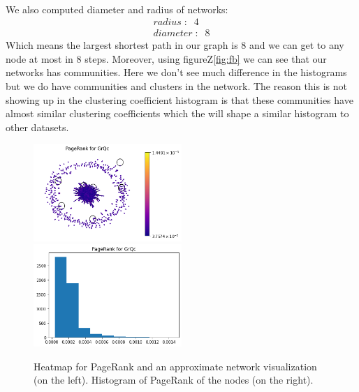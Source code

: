 \documentclass[letterpaper, 11pt]{article}
\newcommand{\1}{\mathds{1}}	%
\theoremstyle{definition}
\begin{document}
\paragraph{}We also computed diameter and radius of networks:
\begin{equation}
\begin{split} 
radius\; :\;\; 4 \\
diameter\;:\;\; 8
\end{split}
\end{equation}
Which means the largest shortest path in our graph is 8 and we can get to any node at most in 8 steps. Moreover, using figureZ\ref{fig:fb} we can see that our networks has communities. Here we don't see much difference in the histograms but we do have communities and clusters in the network. The reason this is not showing up in the clustering coefficient histogram is that these communities have almost similar clustering coefficients which the will shape a similar histogram to other datasets.
\begin{figure}[h]
\includegraphics[width=0.5\textwidth]{GrQc_pr.png}
\includegraphics[width=0.5\textwidth]{GrQc_pr_hist.png}
\captionsetup{justification=centering,margin=0.5cm}
\caption{Heatmap for PageRank and an approximate network visualization (on the left). Histogram of PageRank of the nodes (on the right).}
\label{fig:pr}
\end{figure}
\end{document}
